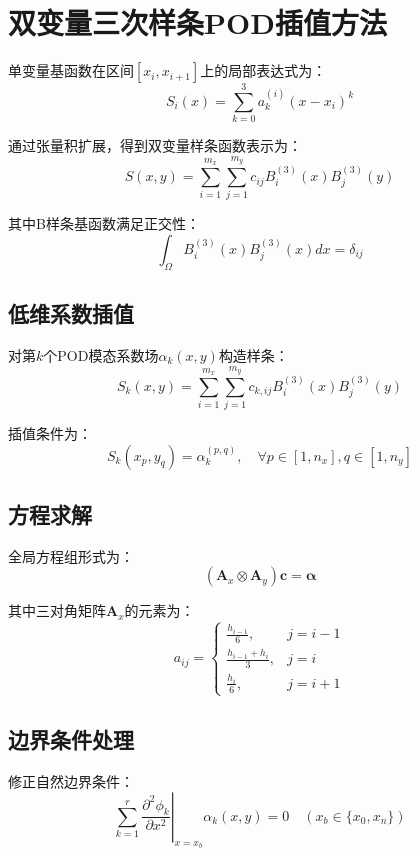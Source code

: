 \section{双变量三次样条POD插值方法}
单变量基函数在区间$[x_i,x_{i+1}]$上的局部表达式为：
\begin{equation}
    S_i(x) = \sum_{k=0}^3 a_k^{(i)}(x-x_i)^k
\end{equation}

通过张量积扩展，得到双变量样条函数表示为：
\begin{equation}
    S(x,y) = \sum_{i=1}^{m_x}\sum_{j=1}^{m_y} c_{ij}B_i^{(3)}(x)B_j^{(3)}(y)
\end{equation}

其中B样条基函数满足正交性：
\begin{equation}
    \int_{\Omega} B_i^{(3)}(x)B_j^{(3)}(x)dx = \delta_{ij}
\end{equation}
\subsection{低维系数插值}
对第$k$个POD模态系数场$\alpha_k(x,y)$构造样条：
\begin{equation}
    S_k(x,y) = \sum_{i=1}^{m_x}\sum_{j=1}^{m_y} c_{k,ij}B_i^{(3)}(x)B_j^{(3)}(y)
\end{equation}

插值条件为：
\begin{equation}
    S_k(x_p,y_q) = \alpha_k^{(p,q)},\quad \forall p\in[1,n_x],q\in[1,n_y]
\end{equation}

\subsection{方程求解}
全局方程组形式为：
\begin{equation}
    (\mathbf{A}_x \otimes \mathbf{A}_y)\mathbf{c} = \boldsymbol{\alpha}
\end{equation}

其中三对角矩阵$\mathbf{A}_x$的元素为：
\begin{equation}
    a_{ij} = \begin{cases}
        \frac{h_{i-1}}{6}, & j=i-1 \\
        \frac{h_{i-1}+h_i}{3}, & j=i \\
        \frac{h_i}{6}, & j=i+1
    \end{cases}
\end{equation}

\subsection{边界条件处理}
修正自然边界条件：
\begin{equation}
    \sum_{k=1}^r \left.\frac{\partial^2 \phi_k}{\partial x^2}\right|_{x=x_b} \alpha_k(x,y) = 0 \quad (x_b \in \{x_0,x_n\})
\end{equation}

